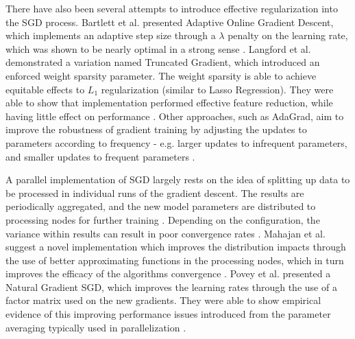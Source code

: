 \documentclass[a4paper,latin]{paper}
\begin{document}
There have also been several attempts to introduce effective regularization into the SGD process. Bartlett et al. 
presented Adaptive Online Gradient Descent, which implements an adaptive step size through a $\lambda$ 
penalty on the learning rate, which was shown to be nearly optimal in a strong sense \cite{Bartlett}. Langford et al. 
demonstrated a variation named Truncated Gradient, which introduced an enforced weight sparsity parameter. 
The weight sparsity is able to achieve equitable effects to $L_1$ regularization (similar to Lasso Regression). 
They were able to show that implementation performed effective feature reduction, while having little effect on 
performance \cite{Langford}. Other approaches, such as AdaGrad, aim to improve the robustness of gradient training by 
adjusting the updates to parameters according to frequency - e.g. larger updates to infrequent parameters, and 
smaller updates to frequent parameters \cite{Duchi, Zeiler}. 
\hfill\break

A parallel implementation of SGD largely rests on the idea of splitting up data to be processed in individual runs 
of the gradient descent. The results are periodically aggregated, and the new model parameters are distributed 
to processing nodes for further training \cite{Zinkevich}. Depending on the configuration, the variance within results can 
result in poor convergence rates \cite{Mahajan}. Mahajan et al. suggest a novel implementation which improves the 
distribution impacts through the use of better approximating functions in the processing nodes, which in turn 
improves the efficacy of the algorithms convergence \cite{Mahajan}. Povey et al. presented a Natural Gradient SGD, 
which improves the learning rates through the use of a factor matrix used on the new gradients. They were able 
to show empirical evidence of this improving performance issues introduced from the parameter averaging 
typically used in parallelization \cite{Povey}.
\hfill\break
\end{document}
